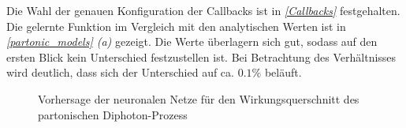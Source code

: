 Die Wahl der genauen Konfiguration der Callbacks ist in \textit{\autoref{Callbacks}} festgehalten.
Die gelernte Funktion im Vergleich mit den analytischen Werten ist in \textit{\autoref{partonic_models} (a)}  gezeigt. Die Werte überlagern sich gut, sodass auf den ersten Blick kein Unterschied festzustellen ist. Bei Betrachtung des Verhältnisses wird deutlich, dass sich der Unterschied auf ca. $0.1\%$ beläuft. 
\begin{figure}[hbt]
	\centering
	\caption{Vorhersage der neuronalen Netze für den Wirkungsquerschnitt des partonischen Diphoton-Prozess}
	\label{partonic_models}
\end{figure}

